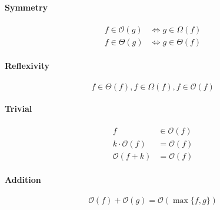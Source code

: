 \documentclass[12pt, a4paper]{scrartcl}
\newcommand{\bigO}{\mathcal{O}}
\begin{document}
\paragraph{Symmetry}
\begin{align}
  f\in\mathcal{O}(g)&\Leftrightarrow g \in \Omega(f)\\
  f\in\Theta(g) &\Leftrightarrow g\in\Theta(f)
\end{align}

\paragraph{Reflexivity}

\begin{equation}
  f\in\Theta(f), f\in\Omega(f), f\in\mathcal{O}(f)
\end{equation}
\paragraph{Trivial}
  \begin{align}
    f&\in\bigO(f)\\
    k\cdot\bigO(f) &= \bigO(f)\\
    \bigO(f+k) &= \bigO(f)
  \end{align}
\paragraph{Addition}
  \begin{equation}
    \bigO(f)+\bigO(g)=\bigO(\max\{f,g\})
  \end{equation}
\end{document}
